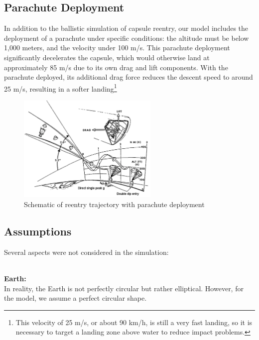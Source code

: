 \documentclass[runningheads]{llncs}
\begin{document}

\subsection{Parachute Deployment}

In addition to the ballistic simulation of capsule reentry, our model includes the deployment of a parachute under specific conditions: the altitude must be below 1,000 meters, and the velocity under 100 m/s. This parachute deployment significantly decelerates the capsule, which would otherwise land at approximately 85 m/s due to its own drag and lift components. With the parachute deployed, its additional drag force reduces the descent speed to around 25 m/s, resulting in a softer landing\footnote{This velocity of 25 m/s, or about 90 km/h, is still a very fast landing, so it is necessary to target a landing zone above water to reduce impact problems.}

\begin{figure}[h]
\centering
\includegraphics[width=0.6\textwidth]{images/parachute_draw.png}
\caption{Schematic of reentry trajectory with parachute deployment \cite{reentry_matters}}
\label{parachute_draw}
\end{figure}






\subsection{Assumptions}

Several aspects were not considered in the simulation:

\textbf{\\Earth:\\}
In reality, the Earth is not perfectly circular but rather elliptical. However, for the model, we assume a perfect circular shape.
\end{document}
